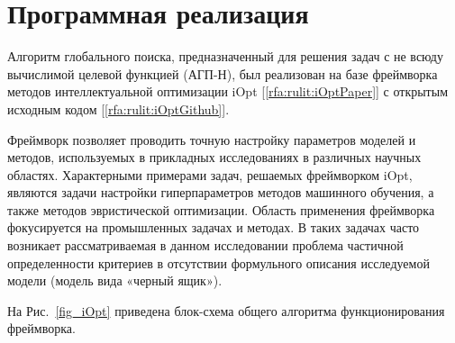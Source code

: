 \documentclass[a4paper,12pt,russian]{article}
\begin{document}

\section{Программная реализация} \label{iOpt_discr}

Алгоритм глобального поиска, предназначенный для решения задач с не всюду вычислимой целевой функцией (АГП-Н), был реализован на базе фреймворка методов интеллектуальной оптимизации iOpt [\ref{rfa:rulit:iOptPaper}] с открытым исходным кодом [\ref{rfa:rulit:iOptGithub}].

Фреймворк позволяет проводить точную настройку параметров моделей и методов, используемых в прикладных исследованиях в различных научных областях. Характерными примерами задач, решаемых фреймворком iOpt, являются задачи настройки гиперпараметров методов машинного обучения, а также методов эвристической оптимизации. Область применения фреймворка фокусируется на промышленных задачах и методах. В таких задачах часто возникает рассматриваемая в данном исследовании проблема частичной определенности критериев в отсутствии формульного описания исследуемой модели (модель вида «черный ящик»). 

На Рис.~\ref{fig_iOpt} приведена блок-схема общего алгоритма функционирования фреймворка.
\end{document}
